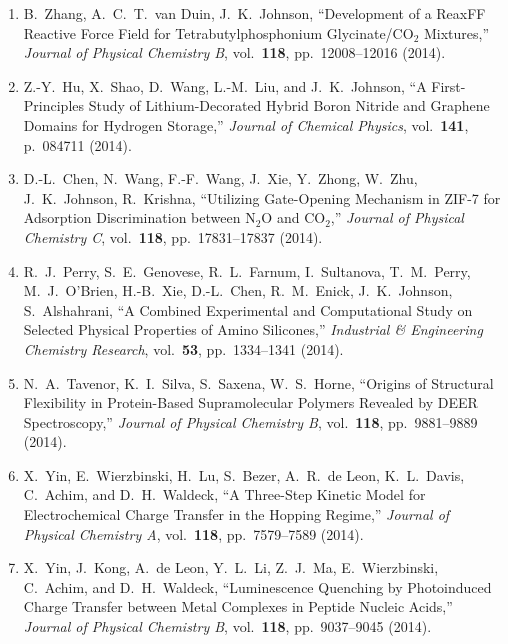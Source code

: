 \begin{enumerate}
\item B.\ Zhang, A.\ C.\ T.\ van Duin, J.\ K.\ Johnson, ``Development of a ReaxFF Reactive Force Field for Tetrabutylphosphonium Glycinate/$\mathrm{CO}_2$ Mixtures,'' \textit{Journal of Physical Chemistry B}, vol.\ \textbf{118}, pp.\ 12008--12016 (2014).

\item Z.-Y.\ Hu, X.\ Shao, D.\ Wang, L.-M.\ Liu, and J.\ K.\ Johnson, ``A  First-Principles Study of Lithium-Decorated Hybrid Boron Nitride and   Graphene Domains for Hydrogen Storage,'' \textit{Journal of Chemical     Physics}, vol.\ \textbf{141}, p.\ 084711 (2014).

\item D.-L.\ Chen, N.\ Wang, F.-F.\ Wang, J.\ Xie, Y.\ Zhong, W.\ Zhu, J.\ K.\ Johnson, R.\ Krishna, ``Utilizing Gate-Opening Mechanism in ZIF-7   for Adsorption Discrimination between $\mathrm{N}_2\mathrm{O}$ and $\mathrm{CO}_2$,'' \textit{Journal of Physical Chemistry C}, vol.\ \textbf{118}, pp.\ 17831--17837 (2014).

\item R.\ J.\ Perry, S.\ E.\ Genovese, R.\ L.\ Farnum, I.\ Sultanova, T.\ M.\ Perry, M.\ J.\ O'Brien, H.-B.\ Xie, D.-L.\ Chen, R.\ M.\ Enick, J.\ K.\ Johnson, S.\ Alshahrani, ``A Combined Experimental and Computational Study on Selected Physical Properties of Amino Silicones,'' \textit{Industrial \& Engineering Chemistry Research}, vol.\ \textbf{53}, pp.\ 1334--1341 (2014).

\item N.\ A.\ Tavenor, K.\ I.\ Silva, S.\ Saxena, W.\ S.\ Horne, ``Origins of Structural Flexibility in Protein-Based Supramolecular Polymers Revealed by DEER Spectroscopy,'' \textit{Journal of Physical Chemistry B}, vol.\ \textbf{118}, pp.\ 9881--9889 (2014).

\item X.\ Yin, E.\ Wierzbinski, H.\ Lu, S.\ Bezer, A.\ R.\ de Leon,  K.\ L.\ Davis, C.\ Achim, and D.\ H.\ Waldeck, ``A Three-Step Kinetic Model   for Electrochemical Charge Transfer in the Hopping Regime,'' \textit{Journal of Physical Chemistry A}, vol.\ \textbf{118}, pp.\ 7579--7589 (2014).

\item X.\ Yin, J.\ Kong, A.\ de Leon, Y.\ L.\ Li, Z.\ J.\ Ma, E.\ Wierzbinski, C.\ Achim, and D.\ H.\ Waldeck, ``Luminescence Quenching by Photoinduced Charge Transfer between Metal Complexes in Peptide Nucleic Acids,'' \textit{Journal of Physical Chemistry B}, vol.\ \textbf{118}, pp.\ 9037--9045 (2014).


\end{enumerate}
